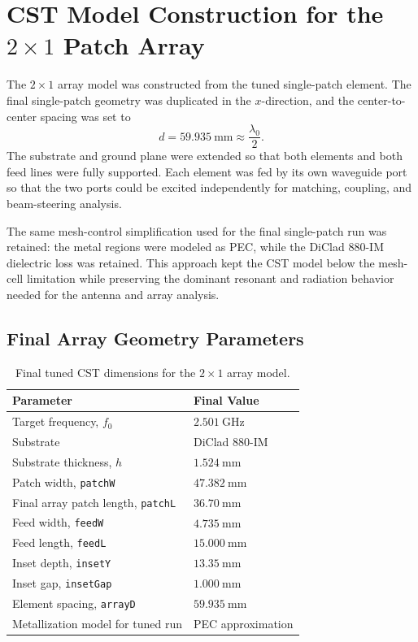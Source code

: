 \section{CST Model Construction for the \texorpdfstring{\(2\times1\)}{2x1} Patch Array}
\label{sec:cst-array-model}

The \(2\times1\) array model was constructed from the tuned single-patch element.  The final
single-patch geometry was duplicated in the \(x\)-direction, and the center-to-center spacing was set
to
\[
 d = 59.935~\mathrm{mm}\approx \frac{\lambda_0}{2}.
\]
The substrate and ground plane were extended so that both elements and both feed lines were fully
supported.  Each element was fed by its own waveguide port so that the two ports could be excited
independently for matching, coupling, and beam-steering analysis.

The same mesh-control simplification used for the final single-patch run was retained: the metal
regions were modeled as PEC, while the DiClad 880-IM dielectric loss was retained.  This approach
kept the CST model below the mesh-cell limitation while preserving the dominant resonant and
radiation behavior needed for the antenna and array analysis.

\subsection{Final Array Geometry Parameters}

\begin{table}[H]
\centering
\caption{Final tuned CST dimensions for the \(2\times1\) array model.}
\label{tab:cst-array-final-parameters}
\begin{tabular}{@{}ll@{}}
\toprule
\textbf{Parameter} & \textbf{Final Value} \\
\midrule
Target frequency, \(f_0\) & \(2.501~\mathrm{GHz}\) \\
Substrate & DiClad 880-IM \\
Substrate thickness, \(h\) & \(1.524~\mathrm{mm}\) \\
Patch width, \texttt{patchW} & \(47.382~\mathrm{mm}\) \\
Final array patch length, \texttt{patchL} & \(36.70~\mathrm{mm}\) \\
Feed width, \texttt{feedW} & \(4.735~\mathrm{mm}\) \\
Feed length, \texttt{feedL} & \(15.000~\mathrm{mm}\) \\
Inset depth, \texttt{insetY} & \(13.35~\mathrm{mm}\) \\
Inset gap, \texttt{insetGap} & \(1.000~\mathrm{mm}\) \\
Element spacing, \texttt{arrayD} & \(59.935~\mathrm{mm}\) \\
Metallization model for tuned run & PEC approximation \\
\bottomrule
\end{tabular}
\end{table}


